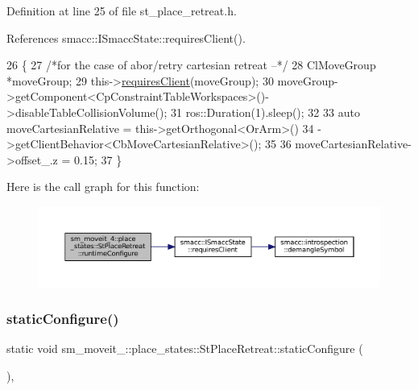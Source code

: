 Definition at line 25 of file st\+\_\+place\+\_\+retreat.\+h.



References smacc\+::\+I\+Smacc\+State\+::requires\+Client().


\begin{DoxyCode}
26             \{
27                 \textcolor{comment}{/*for the case of abor/retry cartesian retreat --*/}
28                 ClMoveGroup *moveGroup;
29                 this->\hyperlink{classsmacc_1_1ISmaccState_a7f95c9f0a6ea2d6f18d1aec0519de4ac}{requiresClient}(moveGroup);
30                 moveGroup->getComponent<CpConstraintTableWorkspaces>()->disableTableCollisionVolume();
31                 ros::Duration(1).sleep();
32 
33                 \textcolor{keyword}{auto} moveCartesianRelative = this->getOrthogonal<OrArm>()
34                                                  ->getClientBehavior<CbMoveCartesianRelative>();
35 
36                 moveCartesianRelative->offset\_.z = 0.15;
37             \}
\end{DoxyCode}
Here is the call graph for this function\+:
\nopagebreak
\begin{figure}[H]
\begin{center}
\leavevmode
\includegraphics[width=350pt]{structsm__moveit__4_1_1place__states_1_1StPlaceRetreat_a592a95bb086fd10381dee175af55e71e_cgraph}
\end{center}
\end{figure}
\mbox{\label{structsm__moveit__4_1_1place__states_1_1StPlaceRetreat_aa3f44a56c5471fb113afb7b3cfd7d44e}} 
\subsubsection{\texorpdfstring{static\+Configure()}{staticConfigure()}}
{\footnotesize\ttfamily static void sm\+\_\+moveit\+\_\+::place\+\_\+states\+::\+St\+Place\+Retreat\+::static\+Configure (\begin{DoxyParamCaption}{ }\end{DoxyParamCaption})\hspace{0.3cm}{\ttfamily [inline]}, {\ttfamily [static]}}



